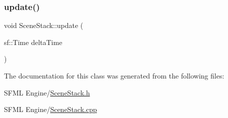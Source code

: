 \mbox{\label{class_scene_stack_acdea2588bbc85c2834608ebab6671866}} 
\subsubsection{\texorpdfstring{update()}{update()}}
{\footnotesize\ttfamily void Scene\+Stack\+::update (\begin{DoxyParamCaption}\item[{sf\+::\+Time}]{delta\+Time }\end{DoxyParamCaption})}



The documentation for this class was generated from the following files\+:\begin{DoxyCompactItemize}
\item 
S\+F\+M\+L Engine/\hyperlink{_scene_stack_8h}{Scene\+Stack.\+h}\item 
S\+F\+M\+L Engine/\hyperlink{_scene_stack_8cpp}{Scene\+Stack.\+cpp}\end{DoxyCompactItemize}
